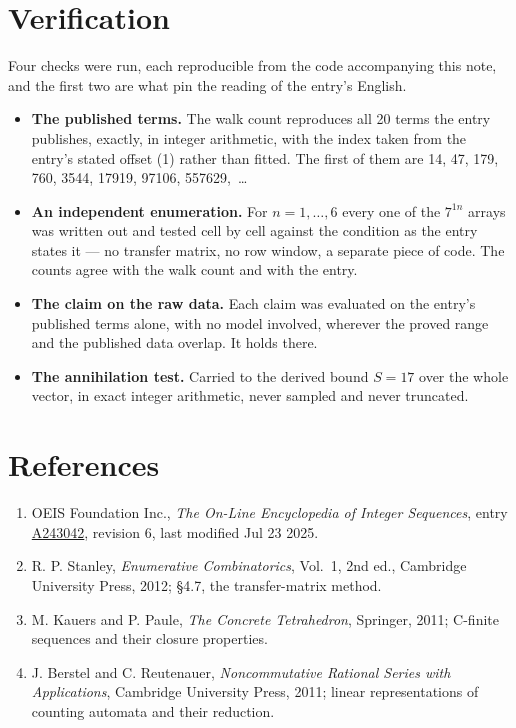 \documentclass[11pt]{article}
\theoremstyle{definition}
\begin{document}
\section{Verification}

Four checks were run, each reproducible from the code accompanying this note, and the first two are what pin the reading of the entry's English.

\begin{itemize}

\item {\bfseries The published terms.} The walk count reproduces all 20 terms the entry publishes, exactly, in integer arithmetic, with the index taken from the entry's stated offset (1) rather than fitted. The first of them are 14, 47, 179, 760, 3544, 17919, 97106, 557629,~\dots

\item {\bfseries An independent enumeration.} For $n = 1,\dots,6$ every one of the $7^{1n}$ arrays was written out and tested cell by cell against the condition as the entry states it --- no transfer matrix, no row window, a separate piece of code. The counts agree with the walk count and with the entry.

\item {\bfseries The claim on the raw data.} Each claim was evaluated on the entry's published terms alone, with no model involved, wherever the proved range and the published data overlap. It holds there.

\item {\bfseries The annihilation test.} Carried to the derived bound $S = 17$ over the whole vector, in exact integer arithmetic, never sampled and never truncated.

\end{itemize}

\section{References}

\begin{enumerate}

\item OEIS Foundation Inc., \emph{The On-Line Encyclopedia of Integer Sequences}, entry \href{https://oeis.org/A243042}{A243042}, revision 6, last modified Jul 23 2025.

\item R. P. Stanley, \emph{Enumerative Combinatorics}, Vol.~1, 2nd ed., Cambridge University Press, 2012; \S4.7, the transfer-matrix method.

\item M. Kauers and P. Paule, \emph{The Concrete Tetrahedron}, Springer, 2011; C-finite sequences and their closure properties.

\item J. Berstel and C. Reutenauer, \emph{Noncommutative Rational Series with Applications}, Cambridge University Press, 2011; linear representations of counting automata and their reduction.

\end{enumerate}
\end{document}
